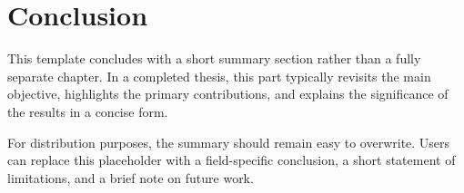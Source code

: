 \section{Conclusion}

This template concludes with a short summary section rather than a fully separate chapter. In a completed thesis, this part typically revisits the main objective, highlights the primary contributions, and explains the significance of the results in a concise form.

For distribution purposes, the summary should remain easy to overwrite. Users can replace this placeholder with a field-specific conclusion, a short statement of limitations, and a brief note on future work.
